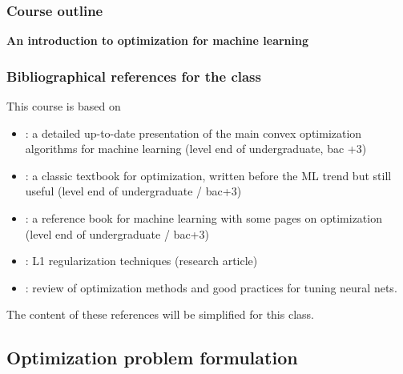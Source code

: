 \documentclass[12pt]{beamer}
\begin{document}
\begin{frame}%
\frametitle{Course outline} 
\begin{multicols}{2}
\begin{center} \textbf{An introduction to optimization for machine learning} \end{center}
\tableofcontents[currentsection]
\end{multicols}
\end{frame}

\begin{frame}
\frametitle{Bibliographical references for the class}
{\small
This course is based on
\begin{itemize}
\item \cite{ravikumar17} : a detailed up-to-date presentation of the main convex optimization algorithms for machine learning (level end of undergraduate, bac +3)
\item \cite{minoux2008programmation} : a classic textbook for optimization, written before the ML trend but still useful (level end of undergraduate / bac+3)
\item \cite{bishop2006pattern} : a reference book for machine learning with some pages on optimization (level end of undergraduate / bac+3)
\item \cite{schmidt2007fast} : L1 regularization techniques (research article)
\item \cite{sun2019optimization} : review of optimization methods and good practices for tuning neural nets.
\end{itemize}
The content of these references will be simplified for this class.
} %
\end{frame}

\subsection{Optimization problem formulation}
\end{document}
